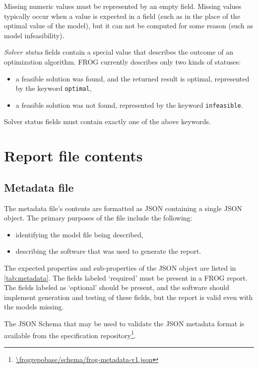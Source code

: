 Missing numeric values must be represented by an empty field. Missing values typically occur when a value is expected in a field (such as in the place of the optimal value of the model), but it can not be computed for some reason (such as model infeasibility).

\emph{Solver status} fields contain a special value that describes the outcome of an optimization algorithm. FROG currently describes only two kinds of statuses:
\begin{itemize}
\item a feasible solution was found, and the returned result is optimal, represented by the keyword \verb|optimal|,
\item a feasible solution was not found, represented by the keyword \verb|infeasible|.
\end{itemize}
Solver status fields must contain exactly one of the above keywords.

\section{Report file contents}

\subsection{Metadata file}
\label{sec:meta}

The metadata file's contents are formatted as JSON containing a single JSON object.
The primary purposes of the file include the following:
\begin{itemize}
\item identifying the model file being described,
\item describing the software that was used to generate the report.
\end{itemize}

The expected properties and sub-properties of the JSON object are listed in \cref{tab:metadata}. The fields labeled `required' must be present in a FROG report. The fields labeled as `optional' should be present, and the software should implement generation and testing of these fields, but the report is valid even with the models missing.

The JSON Schema that may be used to validate the JSON metadata format is available from the specification repository\footnote{\url{\frogrepobase/schema/frog-metadata-v1.json}}.

